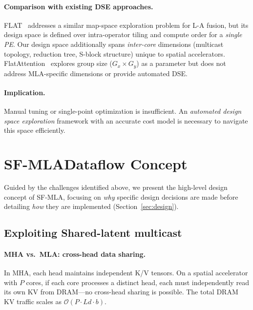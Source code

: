 \documentclass[sigconf, review, anonymous]{acmart}
\newcommand{\brand}{SF-MLA}
\newcommand{\sysname}{\textsc{\brand}\xspace}
\newcommand{\SblockName}{S-block}
\newcommand{\SharedLatentMulticast}{Shared-latent multicast}
\begin{document}
\paragraph{Comparison with existing DSE approaches.}
FLAT~\cite{kao2023flat} addresses a similar map-space exploration
problem for L-A fusion, but its design space is defined over
intra-operator tiling and compute order for a \emph{single PE}.
Our design space additionally spans \emph{inter-core} dimensions
(multicast topology, reduction tree, \SblockName{} structure) unique to
spatial accelerators.  FlatAttention~\cite{flatattention2024}
explores group size ($G_x \times G_y$) as a parameter but does not
address MLA-specific dimensions or provide automated DSE.

\paragraph{Implication.}
Manual tuning or single-point optimization is insufficient.
An \emph{automated design space exploration} framework with an
accurate cost model is necessary to navigate this space efficiently.


\section{\brand Dataflow Concept}\label{sec:concept}

Guided by the challenges identified above, we present the high-level
design concept of \sysname, focusing on \emph{why} specific design
decisions are made before detailing \emph{how} they are implemented
(Section~\ref{sec:design}).



\subsection{Exploiting \SharedLatentMulticast}\label{sec:concept-mcast}


\paragraph{MHA vs.\ MLA: cross-head data sharing.}
In MHA, each head maintains independent K/V tensors.  On a spatial
accelerator with $P$ cores, if each core processes a distinct head,
each must independently read its own KV from DRAM---no cross-head
sharing is possible.  The total DRAM KV traffic scales as $\mathcal{O}(P \cdot Ld \cdot b)$.
\end{document}
